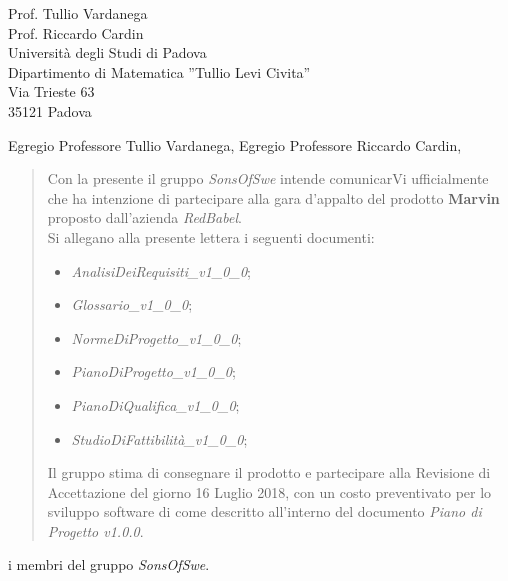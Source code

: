 \documentclass{letter}
\newcommand{\gruppo}{\emph{SonsOfSwe}}
\begin{document}
	
\begin{letter} {   
	\hfill Prof. Tullio Vardanega\\
	\hfill Prof. Riccardo Cardin\\
	\hfill Università degli Studi di Padova \\
	\hfill Dipartimento di Matematica ''Tullio Levi Civita'' \\
	\hfill Via Trieste 63 \\
	\hfill 35121 Padova \\
}

\date{}
\opening{Egregio Professore Tullio Vardanega, \newline Egregio Professore Riccardo Cardin,}
	\begin{quotation}
		\noindent Con la presente il gruppo \textit{\gruppo} intende comunicarVi ufficialmente che ha intenzione di partecipare alla gara d'appalto del prodotto \textbf{Marvin} proposto dall'azienda \textit{RedBabel}.\\
		Si allegano alla presente lettera i seguenti documenti:
		\begin{itemize}
			\item \textit{AnalisiDeiRequisiti\_v1\_0\_0};
			\item \textit{Glossario\_v1\_0\_0};
			\item \textit{NormeDiProgetto\_v1\_0\_0};
			\item \textit{PianoDiProgetto\_v1\_0\_0};
			\item \textit{PianoDiQualifica\_v1\_0\_0};
			\item \textit{StudioDiFattibilità\_v1\_0\_0};
		\end{itemize}
		Il gruppo stima di consegnare il prodotto e partecipare alla Revisione di Accettazione del giorno 16 Luglio 2018, con un costo preventivato per lo sviluppo software di  come descritto all’interno del documento \textit{Piano di Progetto v1.0.0}.
	\end{quotation}
{
	\setlength\parindent{24pt}
	\indent i membri del gruppo \gruppo.
}
\end{letter}
\end{document}
